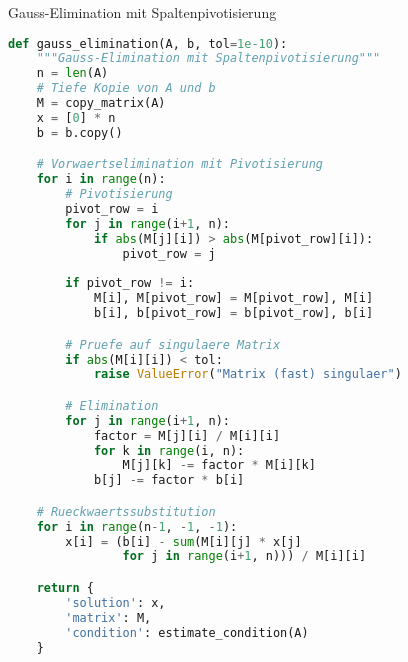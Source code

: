 \begin{examplecode}{Gauss-Elimination mit Spaltenpivotisierung}
\begin{lstlisting}[language=Python, style=basesmol]
def gauss_elimination(A, b, tol=1e-10):
    """Gauss-Elimination mit Spaltenpivotisierung"""
    n = len(A)
    # Tiefe Kopie von A und b
    M = copy_matrix(A)
    x = [0] * n
    b = b.copy()

    # Vorwaertselimination mit Pivotisierung
    for i in range(n):
        # Pivotisierung
        pivot_row = i
        for j in range(i+1, n):
            if abs(M[j][i]) > abs(M[pivot_row][i]):
                pivot_row = j
                
        if pivot_row != i:
            M[i], M[pivot_row] = M[pivot_row], M[i]
            b[i], b[pivot_row] = b[pivot_row], b[i]

        # Pruefe auf singulaere Matrix
        if abs(M[i][i]) < tol:
            raise ValueError("Matrix (fast) singulaer")

        # Elimination
        for j in range(i+1, n):
            factor = M[j][i] / M[i][i]
            for k in range(i, n):
                M[j][k] -= factor * M[i][k]
            b[j] -= factor * b[i]

    # Rueckwaertssubstitution
    for i in range(n-1, -1, -1):
        x[i] = (b[i] - sum(M[i][j] * x[j] 
                for j in range(i+1, n))) / M[i][i]

    return {
        'solution': x,
        'matrix': M,
        'condition': estimate_condition(A)
    }
\end{lstlisting}
\end{examplecode}

